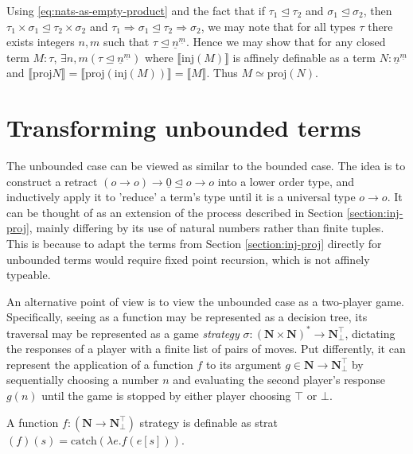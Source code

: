 \documentclass[12pt,a4paper]{report}
\theoremstyle{definition}
\theoremstyle{definition}
\theoremstyle{remark}
\begin{document}
Using \eqref{eq:nats-as-empty-product} and the fact that if $\tau_1 \trianglelefteq \tau_2$ and $\sigma_1 \trianglelefteq \sigma_2$, then $\tau_1 \times \sigma_1 \trianglelefteq \tau_2 \times \sigma_2$ and $\tau_1 \Rightarrow \sigma_1 \trianglelefteq \tau_2 \Rightarrow \sigma_2 $, we may note that for all types $\tau$ there exists integers $n, m$ such that $\tau \trianglelefteq \underline{n}^{\underline{m}}$. Hence we may show that for any closed term $M : \tau$, $\exists n,m (\tau \trianglelefteq \underline{n}^{\underline{m}})$ where $\llbracket \text{inj}(M) \rrbracket$ is affinely definable as a term $N : \underline{n}^{\underline{m}}$ and $\llbracket \text{proj} N \rrbracket = \llbracket \text{proj}(\text{inj}(M))\rrbracket = \llbracket M \rrbracket$. Thus $M \simeq \text{proj}(N)$. 

\section{Transforming unbounded terms}
The unbounded case can be viewed as similar to the bounded case. The idea is to construct a retract $(o \rightarrow o) \rightarrow \underline{0} \trianglelefteq o \rightarrow o$ into a lower order type, and inductively apply it to 'reduce' a term's type until it is a universal type $o \rightarrow o$. It can be thought of as an extension of the process described in Section \ref{section:inj-proj}, mainly differing by its use of natural numbers rather than finite tuples. This is because to adapt the terms from Section \ref{section:inj-proj} directly for unbounded terms would require fixed point recursion, which is not affinely typeable.

An alternative point of view is to view the unbounded case as a two-player game. Specifically, seeing as a function may be represented as a decision tree, its traversal may be represented as a game \emph{strategy} $\sigma : (\textbf{N} \times \textbf{N})^* \rightarrow \textbf{N}_\bot^\top$, dictating the responses of a player with a finite list of pairs of moves. Put differently, it can represent the application of a function $f$ to its argument $g \in \textbf{N}\rightarrow \textbf{N}_\bot^\top$ by sequentially choosing a number $n$ and evaluating the second player's response $g(n)$ until the game is stopped by either player choosing $\top$ or $\bot$.

A function $f : (\textbf{N} \rightarrow \textbf{N}_\bot^\top)$ strategy is definable as strat$(f)(s) = \text{catch}(\lambda e.f(e[s]))$.
\end{document}
